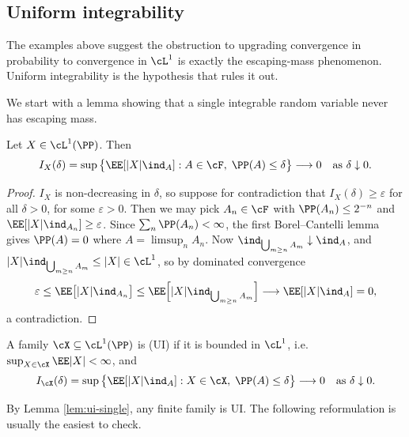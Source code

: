 \subsection{Uniform integrability}

The examples above suggest the obstruction to upgrading convergence in probability to convergence in $\cL^1$ is exactly the escaping-mass phenomenon. Uniform integrability is the hypothesis that rules it out.

We start with a lemma showing that a single integrable random variable never has escaping mass.

\begin{lemma}\label{lem:ui-single}
	Let $X \in \cL^1(\PP)$. Then
	$$
	I_X(\delta) = \sup\big\{ \EE[|X|\ind_A] : A \in \cF, \; \PP(A)\leq\delta\big\} \longrightarrow 0 \quad \text{as } \delta \downarrow 0.
	$$
\end{lemma}
\begin{proof}
	$I_X$ is non-decreasing in $\delta$, so suppose for contradiction that $I_X(\delta) \geq \varepsilon$ for all $\delta>0$, for some $\varepsilon>0$. Then we may pick $A_n \in \cF$ with $\PP(A_n) \leq 2^{-n}$ and $\EE[|X|\ind_{A_n}]\geq\varepsilon$. Since $\sum_n\PP(A_n)<\infty$, the first Borel--Cantelli lemma gives $\PP(A)=0$ where $A = \limsup_n A_n$. Now $\ind_{\bigcup_{m\geq n}A_m}\downarrow \ind_A$, and $|X|\ind_{\bigcup_{m\geq n}A_m}\leq|X|\in\cL^1$, so by dominated convergence
	$$
	\varepsilon \leq \EE\big[|X|\ind_{A_n}\big] \leq \EE\Big[|X|\ind_{\bigcup_{m\geq n}A_m}\Big] \longrightarrow \EE[|X|\ind_A] = 0,
	$$
	a contradiction.
\end{proof}

\begin{definition}
	A family $\cX \subseteq \cL^1(\PP)$ is  (UI) if it is bounded in $\cL^1$, i.e.\ $\sup_{X\in\cX}\EE|X|<\infty$, and
	$$
	I_\cX(\delta) = \sup\big\{ \EE[|X|\ind_A] : X \in \cX, \; \PP(A)\leq\delta\big\} \longrightarrow 0 \quad \text{as } \delta\downarrow 0.
	$$
\end{definition}

By Lemma \ref{lem:ui-single}, any finite family is UI. The following reformulation is usually the easiest to check.

